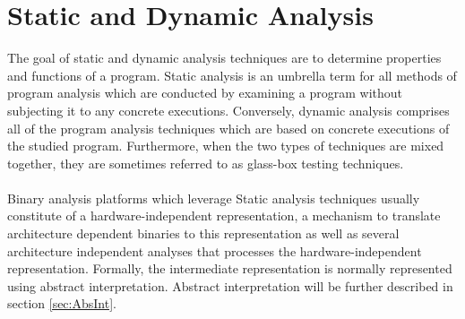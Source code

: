 \documentclass{kththesis}
\newcommand{\fbcomment}[1]{{#1}}
\renewcommand{\fbcomment}[1]{}
\begin{document}


\section{Static and Dynamic Analysis}
\fbcomment{\color{red}Goal: Explain challenges of static analysis. Also, pros and cons of using static and dynamic analysis}
The goal of static and dynamic analysis techniques are to determine properties and
functions of a program\cite{staticOfInd}. Static analysis is an umbrella term for all methods of program analysis which are conducted by examining a program without subjecting it to any concrete executions. Conversely, dynamic analysis comprises all of the program analysis techniques which are based on concrete executions of the studied program. Furthermore, when the two types of techniques are mixed together, they are sometimes referred to as glass-box testing techniques\cite{DefinitionStaticAnal}.
\\ \\
Binary analysis platforms which leverage Static analysis techniques usually constitute of a hardware-independent representation, a mechanism to translate architecture dependent binaries to this representation as well as several architecture independent analyses that processes the hardware-independent representation\cite{TrABin}. Formally, the intermediate representation is normally represented using abstract interpretation\cite{Jakstab}. Abstract interpretation will be further described in section \ref{sec:AbsInt}.
\end{document}
